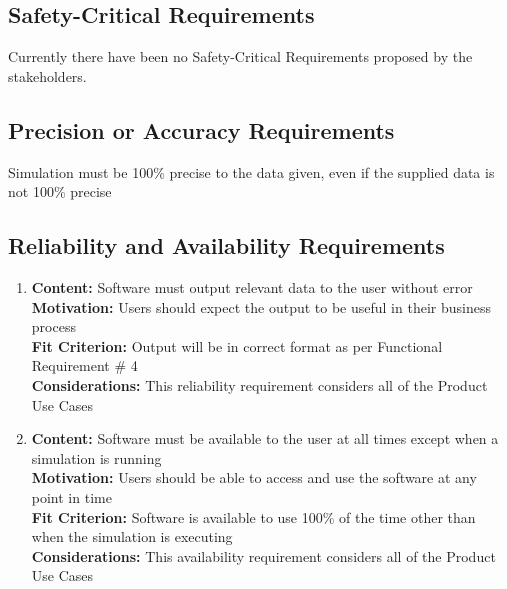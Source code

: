 \documentclass[paper=letter, fontsize=10pt]{scrartcl}
\numberwithin{equation}{section}		%
\numberwithin{figure}{section}			%
\numberwithin{table}{section}				%
\begin{document}
\subsection{Safety-Critical Requirements}
Currently there have been no Safety-Critical Requirements proposed by the stakeholders.
\subsection{Precision or Accuracy Requirements}
Simulation must be 100\% precise to the data given, even if the supplied data is not 100\% precise 
\subsection{Reliability and Availability Requirements}
	\begin{enumerate}
		\item \textbf{Content:} Software must output relevant data to the user without error
		\\	  \textbf{Motivation:} Users should expect the output to be useful in their business process
		\\	  \textbf{Fit Criterion:} Output will be in correct format as per Functional Requirement \# 4
		\\	  \textbf{Considerations:} This reliability requirement considers all of the Product Use Cases 
		\item \textbf{Content:} Software must be available to the user at all times except when a simulation is running
		\\	  \textbf{Motivation:} Users should be able to access and use the software at any point in time
		\\	  \textbf{Fit Criterion:} Software is available to use 100\% of the time other than when the simulation is executing
		\\	  \textbf{Considerations:} This availability requirement considers all of the Product Use Cases 
	\end{enumerate}
\end{document}
